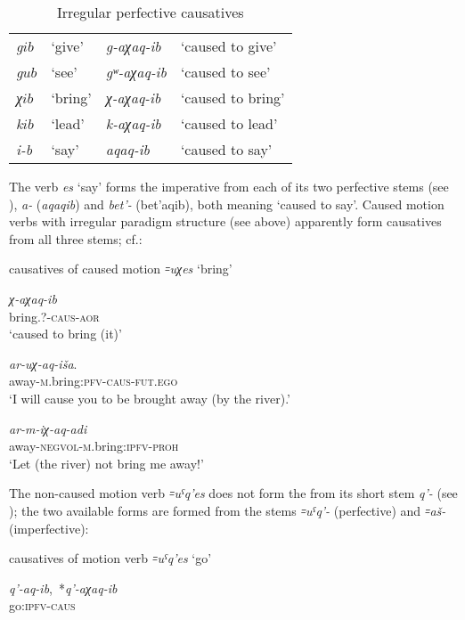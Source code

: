 \documentclass[output=paper]{langsci/langscibook}
\begin{document}
\begin{table}[h]
\caption{Irregular perfective causatives}\label{tab:4:21}

\begin{tabular}{@{}ll@{\qquad}ll@{}}
\toprule
\emph{g\(ib\)}& `give' & \emph{g-aχaq-ib}& `caused to give'\tabularnewline 
\emph{g\(ub\)}& `see' & \emph{gʷ-aχaq-ib}& `caused to see'\tabularnewline
\emph{χ\(ib\)}& `bring' & \emph{χ-aχaq-ib}& `caused to bring'\tabularnewline
\emph{k\(ib\)}& `lead' & \emph{k-aχaq-ib}& `caused to lead'\tabularnewline
\emph{i-b}& `say' & \emph{aqaq-ib}& `caused to say'\tabularnewline
\bottomrule
\end{tabular}
\end{table}

The verb \emph{es} `say' forms the imperative from each of its two
perfective stems (see ), \emph{a-} (\emph{aqaqib}) and
\emph{bet'-} (bet'aqib), both meaning `caused to say'. Caused motion
verbs with irregular paradigm structure (see  above) apparently
form causatives from all three stems; cf.:

\ea %
causatives of caused motion \emph{꞊uχes} `bring'

\ea %
\gll \emph{χ-aχaq-ib}\\
bring.?-\textsc{caus}-\textsc{aor}\\
\glt `caused to bring (it)'

\ex %
\gll \emph{ar-uχ-aq-iša}.\\
away-\textsc{m}.bring:\textsc{pfv}-\textsc{caus}-\textsc{fut}.\textsc{ego}\\
\glt `I will cause you to be brought away (by the river).'

\ex %
\gll \emph{ar-m-iχ-aq-adi}\\
away-\textsc{negvol}-\textsc{m}.bring:\textsc{ipfv}-\textsc{proh}\\
\glt `Let (the river) not bring me away!'
\z
\z

The non-caused motion verb \emph{꞊uˤq'es} does not form the 
from its short stem \emph{q'-} (see ); the two available forms
are formed from the stems \emph{꞊uˤq'-} (perfective) and \emph{꞊aš-}
(imperfective):

\ea %
causatives of motion verb \emph{꞊uˤq'es} `go'

\ea %
\gll *\emph{q'-aq-ib},~*\emph{q'-aχaq-ib}\\
go:\textsc{ipfv}-\textsc{caus}\\
\end{document}
